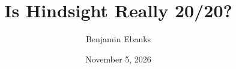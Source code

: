 \documentclass[11pt]{article}
\title{Is Hindsight Really 20/20?}
\author{Benjamin Ebanks}
\date{November 5, 2026}
\begin{document}
\maketitle








{\small


}
\end{document}
